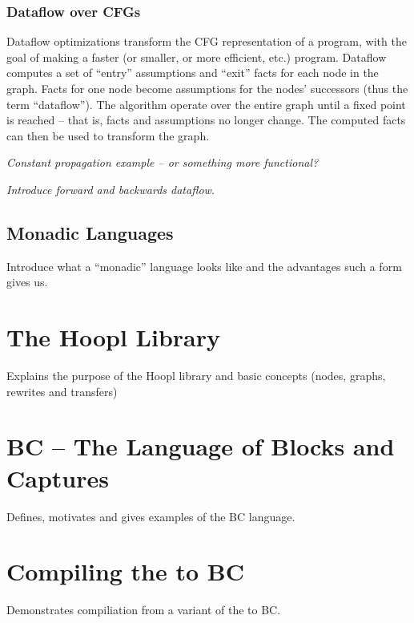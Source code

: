 \documentclass[11pt]{article}
\begin{document}
\subsubsection{Dataflow over CFGs}

Dataflow optimizations transform the CFG representation of a program,
with the goal of making a faster (or smaller, or more efficient, etc.)
program. Dataflow computes a set of ``entry'' assumptions and ``exit''
facts for each node in the graph. Facts for one node become
assumptions for the nodes' successors (thus the term
``dataflow''). The algorithm operate over the entire graph until a
fixed point is reached -- that is, facts and assumptions no longer
change. The computed facts can then be used to transform the graph.

\emph{Constant propagation example -- or something more functional?}

\emph{Introduce forward and backwards dataflow.}




\subsection{Monadic Languages}

Introduce what a ``monadic'' language looks like and the advantages such a form
gives us.

\section{The Hoopl Library}

Explains the purpose of the Hoopl library and basic concepts (nodes,
graphs, rewrites and transfers)

\section{BC -- The Language of Blocks and Captures}

Defines, motivates and gives examples of the BC language.

\section{Compiling the \lamA to BC}

Demonstrates compiliation from a variant of the \lamA to BC. 
\end{document}
